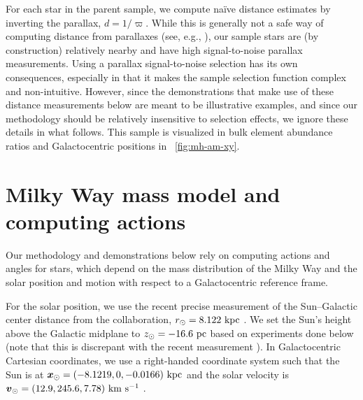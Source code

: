 \documentclass[modern]{aastex63}
\begin{document}
For each star in the parent sample, we compute na\"ive distance estimates by
inverting the parallax, $d = 1/\varpi$.
While this is generally not a safe way of computing distance from parallaxes
(see, e.g., \citealt{Bailer-Jones:2015}), our sample stars are (by construction)
relatively nearby and have high signal-to-noise parallax measurements.
Using a parallax signal-to-noise selection has its own consequences, especially
in that it makes the sample selection function complex and non-intuitive.
However, since the demonstrations that make use of these distance measurements
below are meant to be illustrative examples, and since our methodology should be
relatively insensitive to selection effects, we ignore these details in what
follows.
This sample is visualized in bulk element abundance ratios and Galactocentric
positions in \figurename~\ref{fig:mh-am-xy}.


\section{Milky Way mass model and computing actions}
\label{sec:mw-model}

Our methodology and demonstrations below rely on computing actions and angles
for stars, which depend on the mass distribution of the Milky Way and the solar
position and motion with respect to a Galactocentric reference frame.

For the solar position, we use the recent precise measurement of the
Sun--Galactic center distance from the  collaboration, $r_\odot
= 8.122~\mathrm{kpc}$ \citep{Gravity:2018}.
We set the Sun's height above the Galactic midplane to $z_\odot = -16.6~\mathrm{pc}$
based on experiments done below (note that this is discrepant with the recent
measurement \citealt{Bennett:2019}).
In Galactocentric Cartesian coordinates, we use a right-handed coordinate system
such that the Sun is at $\boldsymbol{x}_\odot = (-8.1219, 0, -0.0166)~\mathrm{kpc}$ and the
solar velocity is $\boldsymbol{v}_\odot = (12.9, 245.6, 7.78)~\mathrm{km}~\mathrm{s}^{-1}$ \citep{Drimmel:2018,
Reid:2004, Gravity:2018}.
\end{document}

